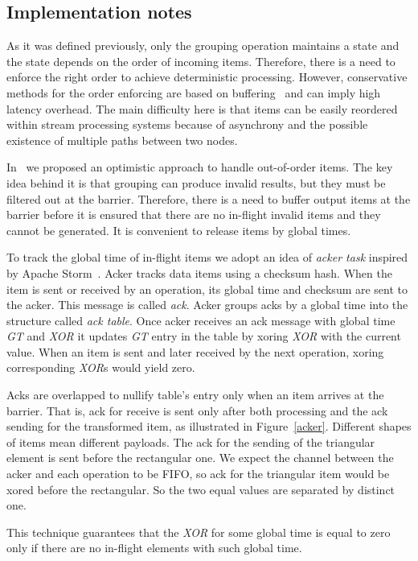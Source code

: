 \subsection{Implementation notes}

As it was defined previously, only the grouping operation maintains a state and the state depends on the order of incoming items. Therefore, there is a need to enforce the right order to achieve deterministic processing. However, conservative methods for the order enforcing are based on buffering~\cite{Li:2008:OPN:1453856.1453890} and can imply high latency overhead. The main difficulty here is that items can be easily reordered within stream processing systems because of asynchrony and the possible existence of multiple paths between two nodes. 

In~\cite{we2018seim} we proposed an optimistic approach to handle out-of-order items. The key idea behind it is that grouping can produce invalid results, but they must be filtered out at the barrier. Therefore, there is a need to buffer output items at the barrier before it is ensured that there are no in-flight invalid items and they cannot be generated. It is convenient to release items by global times.

To track the global time of in-flight items we adopt an idea of {\it acker task} inspired by Apache Storm~\cite{apache:storm}. Acker tracks data items using a checksum hash. When the item is sent or received by an operation, its global time and checksum are sent to the acker. This message is called {\it ack}. Acker groups acks by a global time into the structure called {\it ack table}. Once acker receives an ack message with global time {\it GT} and {\it XOR} it updates {\it GT} entry in the table by xoring {\it XOR} with the current value. When an item is sent and later received by the next operation, xoring corresponding {\it XOR}s would yield zero.

Acks are overlapped to nullify table's entry only when an item arrives at the barrier. That is, ack for receive is sent only after both processing and the ack sending for the transformed item, as illustrated in Figure~\ref{acker}. Different shapes of items mean different payloads. The ack for the sending of the triangular element is sent before the rectangular one. We expect the channel between the acker and each operation to be FIFO, so ack for the triangular item would be xored before the rectangular. So the two equal values are separated by distinct one. 

This technique guarantees that the {\it XOR} for some global time is equal to zero only if there are no in-flight elements with such global time.

